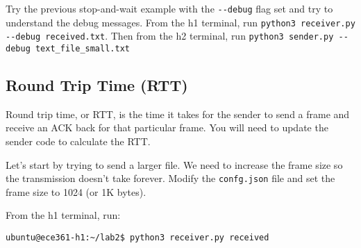 \documentclass[11pt]{article}
\begin{document}
Try the previous stop-and-wait example with the \texttt{-{}-debug} flag set and try to understand the debug messages.
From the h1 terminal, run \texttt{python3 receiver.py -{}-debug received.txt}.
Then from the h2 terminal, run \texttt{python3 sender.py -{}-debug text\_file\_small.txt}
%


\subsection{Round Trip Time (RTT)}
Round trip time, or RTT, is the time it takes for the sender to send a frame and receive an ACK back for that particular frame.
You will need to update the sender code to calculate the RTT.

Let's start by trying to send a larger file. We need to increase the frame size so the transmission doesn't take forever.
Modify the \texttt{confg.json} file and set the frame size to 1024 (or 1K bytes).


From the h1 terminal, run:
\begin{lstlisting}[style=ece361-shell-base, caption={}]
ubuntu@ece361-h1:~/lab2$ python3 receiver.py received
\end{lstlisting}
\end{document}

